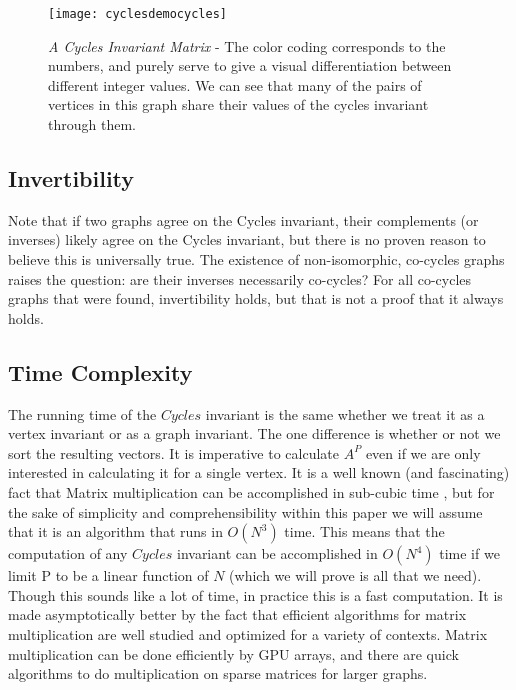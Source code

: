\begin{figure}[h]
\caption{\emph{A Cycles Invariant Matrix} - The color coding corresponds to the numbers, and purely serve to give a visual differentiation between different integer values.  We can see that many of the pairs of vertices in this graph share their values of the cycles invariant through them.}
\centering
\texttt{[image: cyclesdemocycles]}
\label{fig:cyclesdemocycles}
\end{figure}

\subsection{Invertibility}
Note that if two graphs agree on the Cycles invariant, their complements (or inverses) likely agree on the Cycles invariant, but there is no proven reason to believe this is universally true.
The existence of non-isomorphic, co-cycles graphs raises the question: are their inverses necessarily co-cycles?
For all co-cycles graphs that were found, invertibility holds, but that is not a proof that it always holds.


\subsection{Time Complexity}
The running time of the $Cycles$ invariant is the same whether we treat it as a vertex invariant or as a graph invariant.
The one difference is whether or not we sort the resulting vectors.
It is imperative to calculate $A^P$ even if we are only interested in calculating it for a single vertex.
It is a well known (and fascinating) fact that Matrix multiplication can be accomplished in sub-cubic time \cite{subcubicrunningmatrixmult}, but for the sake of simplicity and comprehensibility within this paper we will assume that it is an algorithm that runs in $O(N^3)$  time.
This means that the computation of any $Cycles$ invariant can be accomplished in $O(N^4)$ time if we limit P to be a linear function of $N$ (which we will prove is all that we need).
Though this sounds like a lot of time, in practice this is a fast computation.
It is made asymptotically better by the fact that efficient algorithms for matrix multiplication are well studied and optimized for a variety of contexts.
Matrix multiplication can be done efficiently by GPU arrays, and there are quick algorithms to do multiplication on sparse matrices for larger graphs.


